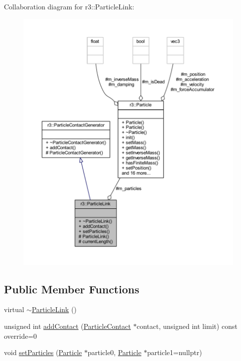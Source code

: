 Collaboration diagram for r3\+:\+:Particle\+Link\+:\nopagebreak
\begin{figure}[H]
\begin{center}
\leavevmode
\includegraphics[width=350pt]{classr3_1_1_particle_link__coll__graph}
\end{center}
\end{figure}
\subsection*{Public Member Functions}
\begin{DoxyCompactItemize}
\item 
virtual \mbox{\hyperlink{classr3_1_1_particle_link_a4477af9dbe9041010985492df2656e55}{$\sim$\+Particle\+Link}} ()
\item 
unsigned int \mbox{\hyperlink{classr3_1_1_particle_link_a07abe1381e0b5ed7e1597099dc0c072d}{add\+Contact}} (\mbox{\hyperlink{classr3_1_1_particle_contact}{Particle\+Contact}} $\ast$contact, unsigned int limit) const override=0
\item 
void \mbox{\hyperlink{classr3_1_1_particle_link_ab3f21ea864e8e2709ef7672a9c417fa1}{set\+Particles}} (\mbox{\hyperlink{classr3_1_1_particle}{Particle}} $\ast$particle0, \mbox{\hyperlink{classr3_1_1_particle}{Particle}} $\ast$particle1=nullptr)
\end{DoxyCompactItemize}
